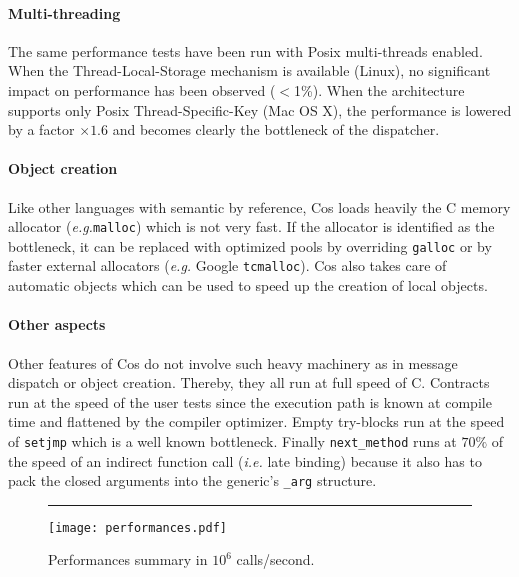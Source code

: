 \documentclass[preprint,10pt]{sigplanconf}
\newcommand{\abbrev}[1]{{\em #1}\xspace}
\newcommand{\ie}{\abbrev{i.e.}}
\newcommand{\eg}{\abbrev{e.g.}}
\newcommand{\acronym}[1]{{\sc #1}\xspace}
\newcommand{\Posix}  {\acronym{Posix}}
\newcommand{\ProgLang}[1]{{\sc #1}\xspace}
\newcommand{\Cos}       {\ProgLang{Cos}}
\newcommand{\hr}{\rule{\columnwidth}{0.33pt}}
\newcommand{\code}[1]{\lstinline[language=COS,style=samplecode]|#1|}
\begin{document}
\paragraph{Multi-threading}

The same performance tests have been run with \Posix multi-threads enabled. When the Thread-Local-Storage mechanism is available (Linux), no significant impact on performance has been observed ($<$1\%). When the architecture supports only \Posix Thread-Specific-Key (Mac OS X), the performance is lowered by a factor $\times 1.6$ and becomes clearly the bottleneck of the dispatcher.

\paragraph{Object creation}

Like other languages with semantic by reference, \Cos loads heavily the C memory allocator (\eg \code{malloc}) which is not very fast. If the allocator is identified as the bottleneck, it can be replaced with optimized pools by overriding \code{galloc} or by faster external allocators (\eg Google \code{tcmalloc}). \Cos also takes care of automatic objects which can be used to speed up the creation of local objects.

\paragraph{Other aspects}

Other features of \Cos do not involve such heavy machinery as in message dispatch or object creation. There\-by, they all run at full speed of C. Contracts run at the speed of the user tests since the execution path is known at compile time and flattened by the compiler optimizer. Empty try-blocks run at the speed of \code{setjmp} which is a well known bottleneck. Finally \code{next_method} runs at $70\%$ of the speed of an indirect function call (\ie late binding) because it also has to pack the closed arguments into the generic's \code{_arg} structure.

\begin{figure}\hr
\begin{center}
\vspace{-2mm}
\texttt{[image: performances.pdf]}
\vspace{-2.5mm}
\end{center}
\caption{Performances summary in $10^6$ calls/second.\label{fig:perf}}
\end{figure}
\end{document}
